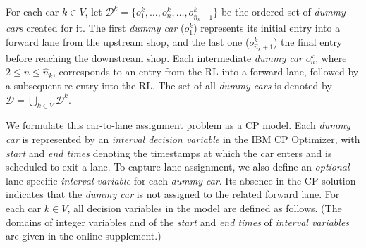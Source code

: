 \documentclass[12pt]{article}
\begin{document}
For each car $k\in V$, let $\mathcal{D}^k=\{o^k_1,\dots,o^k_n,\dots,o^k_{\widehat{n}_k+1}\}$ be the ordered set of \textit{dummy cars} created for it. The first \textit{dummy car} ($o^k_1$) represents its initial entry into a forward lane from the upstream shop, and the last one ($o^k_{\widehat{n}_k+1}$) the final entry before reaching the downstream shop. Each intermediate \textit{dummy car} $o^k_n$, where $2\leqslant n\leqslant \widehat{n}_k$, corresponds to an entry from the RL into a forward lane, followed by a subsequent re-entry into the RL. The set of all \textit{dummy cars} is denoted by $\mathcal{D}=\bigcup_{k\in V}{\mathcal{D}^k}$.



We formulate this car-to-lane assignment problem as a CP model. Each \textit{dummy car} is represented by an \textit{interval decision variable} in the IBM CP Optimizer, with \textit{start} and \textit{end times} denoting the timestamps at which the car enters and is scheduled to exit a lane. %
To capture lane assignment, we also define an \textit{optional} lane-specific \textit{interval variable} for each \textit{dummy car}. Its absence in the CP solution indicates that the \textit{dummy car} is not assigned to the related forward lane. For each car $k\in V$, all decision variables in the model are defined as follows. (The domains of integer variables and of the \textit{start} and \textit{end times} of \textit{interval variables} are given in the online supplement.)
\end{document}
